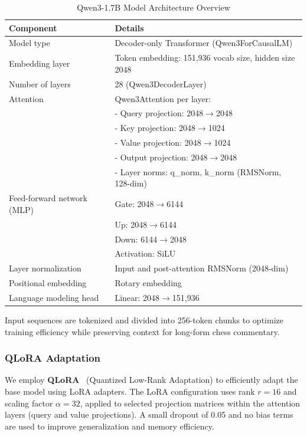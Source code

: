 \documentclass[sigconf,nonacm]{acmart}
\begin{document}
\begin{table}[htbp]
\centering
\caption{Qwen3-1.7B Model Architecture Overview}
\label{tab:model-arch}
\begin{tabular}{@{}ll@{}}
\toprule
\textbf{Component} & \textbf{Details} \\
\midrule
Model type & Decoder-only Transformer (Qwen3ForCausalLM) \\
Embedding layer & Token embedding: 151,936 vocab size, hidden size 2048 \\
Number of layers & 28 (Qwen3DecoderLayer) \\
Attention & Qwen3Attention per layer: \\
& - Query projection: 2048$\rightarrow$2048 \\
& - Key projection: 2048$\rightarrow$1024 \\
& - Value projection: 2048$\rightarrow$1024 \\
& - Output projection: 2048$\rightarrow$2048 \\
& - Layer norms: q\_norm, k\_norm (RMSNorm, 128-dim) \\
Feed-forward network (MLP) & Gate: 2048$\rightarrow$6144 \\
& Up: 2048$\rightarrow$6144 \\
& Down: 6144$\rightarrow$2048 \\
& Activation: SiLU \\
Layer normalization & Input and post-attention RMSNorm (2048-dim) \\
Positional embedding & Rotary embedding \\
Language modeling head & Linear: 2048$\rightarrow$151,936 \\
\bottomrule
\end{tabular}
\end{table}


Input sequences are tokenized and divided into 256-token chunks to optimize training efficiency while preserving context for long-form chess commentary.


\subsubsection{QLoRA Adaptation}

We employ \textbf{QLoRA}~\cite{dettmers2023qlora} (Quantized Low-Rank Adaptation) to efficiently adapt the base model using LoRA adapters. The LoRA configuration uses rank $r=16$ and scaling factor $\alpha=32$, applied to selected projection matrices within the attention layers (query and value projections). A small dropout of 0.05 and no bias terms are used to improve generalization and memory efficiency.
\end{document}
